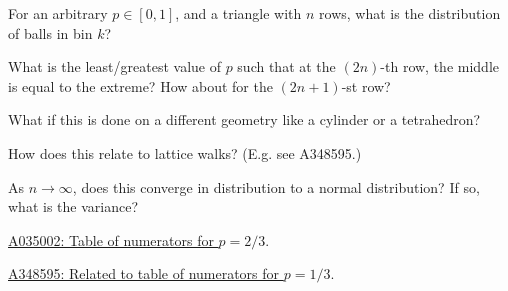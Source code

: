 \documentclass{article}
\begin{document}
\begin{question}
  For an arbitrary $p \in [0, 1]$, and a triangle with $n$ rows,
  what is the distribution of balls in bin $k$?
\end{question}

\begin{related}
  \item What is the least/greatest value of $p$ such that at the $(2n)$-th row,
  the middle is equal to the extreme? How about for the $(2n + 1)$-st row?
  \item What if this is done on a different geometry like a cylinder or a
  tetrahedron?
  \item How does this relate to lattice walks? (E.g. see A348595.)
  \item As $n \rightarrow \infty$, does this converge in distribution to a
  normal distribution? If so, what is the variance?
\end{related}

\begin{references}
  \item \href{https://oeis.org/A035002}{A035002: Table of numerators for $p = 2/3$}.
  \item \href{https://oeis.org/A348595}{A348595: Related to table of numerators for $p = 1/3$}.
\end{references}
\end{document}
